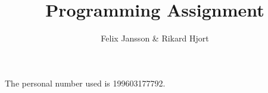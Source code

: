 \documentclass{article}
\author{Felix Jansson \& Rikard Hjort}
\title{Programming Assignment}
\begin{document}
The personal number used is 199603177792.
\end{document}
